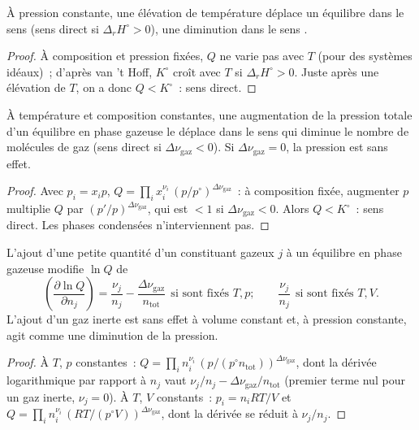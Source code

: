 \begin{proposition}[Température]\label{prop:b2:equilibrium-shifts:temperature}
À pression constante, une élévation de température déplace un équilibre dans le
sens  (sens direct si $\Delta_r H^\circ > 0$), une diminution dans le
sens .
\end{proposition}

\begin{proof}
À composition et pression fixées, $Q$ ne varie pas avec $T$ (pour des systèmes
idéaux)~; d'après van 't Hoff, $K^\circ$ croît avec $T$ si $\Delta_r H^\circ >
0$. Juste après une élévation de $T$, on a donc $Q < K^\circ$~: sens direct.
\end{proof}

\begin{proposition}[Pression]\label{prop:b2:equilibrium-shifts:pressure}
À température et composition constantes, une augmentation de la pression totale d'un
équilibre en phase gazeuse le déplace dans le sens qui diminue le nombre de
molécules de gaz (sens direct si $\Delta\nu_{\text{gaz}} < 0$). Si $\Delta\nu_{\text{gaz}}
= 0$, la pression est sans effet.
\end{proposition}

\begin{proof}
Avec $p_i = x_ip$, $Q = \prod_i x_i^{\nu_i}\,(p/p^\circ)^{\Delta\nu_{\text{gaz}}}$~:
à composition fixée, augmenter $p$ multiplie $Q$ par
$(p'/p)^{\Delta\nu_{\text{gaz}}}$, qui est $< 1$ si $\Delta\nu_{\text{gaz}} <
0$. Alors $Q < K^\circ$~: sens direct. Les phases condensées n'interviennent pas.
\end{proof}

\begin{proposition}\label{prop:b2:equilibrium-shifts:adding}
L'ajout d'une petite quantité d'un constituant gazeux $j$ à un équilibre en phase gazeuse
modifie $\ln Q$ de
\[
  \left(\frac{\partial\ln Q}{\partial n_j}\right) = \frac{\nu_j}{n_j} -
  \frac{\Delta\nu_{\text{gaz}}}{n_{\text{tot}}}\ \ \text{si sont fixés } T, p ;
  \qquad \frac{\nu_j}{n_j}\ \ \text{si sont fixés } T, V .
\]
L'ajout d'un gaz inerte est sans effet à volume constant et, à pression constante,
agit comme une diminution de la pression.
\end{proposition}

\begin{proof}
À $T$, $p$ constantes~: $Q = \prod_i n_i^{\nu_i}\,(p/(p^\circ n_{\text{tot}}))^{
\Delta\nu_{\text{gaz}}}$, dont la dérivée logarithmique par rapport à $n_j$ vaut
$\nu_j/n_j - \Delta\nu_{\text{gaz}}/n_{\text{tot}}$ (premier terme nul pour un gaz
inerte, $\nu_j = 0$). À $T$, $V$ constants~: $p_i = n_iRT/V$ et $Q = \prod_i n_i^{
\nu_i}\,(RT/(p^\circ V))^{\Delta\nu_{\text{gaz}}}$, dont la dérivée se réduit à
$\nu_j/n_j$.
\end{proof}

